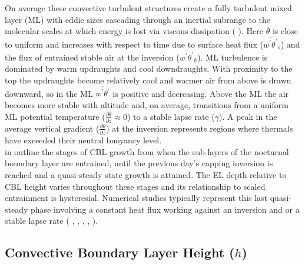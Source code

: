 On average these convective turbulent structures create a fully turbulent mixed layer (\acs{ML}) with eddie sizes cascading through an inertial subrange to the molecular scales at which energy is lost via viscous dissipation (\citeauthor{Stull-BLMetIntro} \citeyear{Stull-BLMetIntro}).  Here $\overline{\theta}$ is close to uniform and increases with respect to time due to surface heat flux ($\overline{w^{'}\theta^{'}}_{s}$) and the flux of entrained stable air at the inversion ($\overline{w^{'}\theta^{'}}_{h}$).  \acs{ML} turbulence is dominated by warm updraughts and cool downdraughts.  With proximity to the top the updraughts become relatively cool and warmer air from above is drawn downward, so in the \acs{ML} $\overline{w^{'}\theta^{'}}$ is positive and decreasing.  Above the \acs{ML} the air becomes more stable with altitude and, on average, transitions from a uniform \acs{ML} potential temperature ($\frac{\partial \overline{\theta}}{\partial z} \approx 0$) to a stable lapse rate ($\gamma$).  A peak in the average vertical gradient ($\frac{\partial \overline{\theta}}{\partial z}$) at the inversion represents regions where thermals have exceeded their neutral buoyancy level. \\

\citeauthor{StullNelEl} in \cite{StullNelEl} outline the stages of \acs{CBL} growth from when the sub-layers of the nocturnal boundary layer are entrained, until the previous day's capping inversion is reached and a quasi-steady state growth is attained.  The \acs{EL} depth relative to \acs{CBL} height varies throughout these stages and its relationship
to scaled entrainment is hysteresial.  Numerical studies typically represent this last quasi-steady phase involving a constant heat flux working against an inversion and or a stable lapse rate (\citeauthor{SchmidtSchu} \cite{SchmidtSchu}, \citeauthor{Sorbjan} \cite{Sorbjan}, \citeauthor{SullMoengStev} \cite{SullMoengStev}, \citeauthor{FedConzMir04} \cite{FedConzMir04}, \citeauthor{BrooksFowler2} \cite{BrooksFowler2}).  

\subsection{Convective Boundary Layer Height ($h$)}
\label{subsec:}


